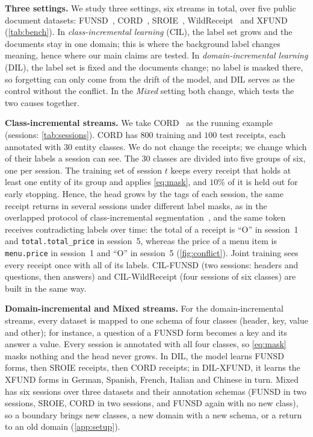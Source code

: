 \documentclass[10pt,twocolumn,letterpaper]{article}
\newcommand{\runin}[1]{\par\addvspace{0.7ex plus .3ex minus .1ex}\noindent\textbf{#1}\hspace{1em}\ignorespaces}
\begin{document}
\runin{Three settings.} We study three settings, six streams in total, over five public document datasets: FUNSD~\citep{jaume2019funsd}, CORD~\citep{park2019cord}, SROIE~\citep{huang2019sroie}, WildReceipt~\citep{sun2021sdmgr} and XFUND~\citep{xu2022xfund} (\cref{tab:bench}). In \emph{class-incremental learning} (CIL), the label set grows and the documents stay in one domain; this is where the background label changes meaning, hence where our main claims are tested. In \emph{domain-incremental learning} (DIL), the label set is fixed and the documents change; no label is masked there, so forgetting can only come from the drift of the model, and DIL serves as the control without the conflict. In the \emph{Mixed} setting both change, which tests the two causes together.

\runin{Class-incremental streams.} We take CORD~\citep{park2019cord} as the running example (sessions: \cref{tab:sessions}). CORD has $800$ training and $100$ test receipts, each annotated with $30$ entity classes. We do not change the receipts; we change which of their labels a session can see. The $30$ classes are divided into five groups of six, one per session. The training set of session $t$ keeps every receipt that holds at least one entity of its group and applies \cref{eq:mask}, and $10\%$ of it is held out for early stopping. Hence, the head grows by the tags of each session, the same receipt returns in several sessions under different label masks, as in the overlapped protocol of class-incremental segmentation~\citep{cermelli2020mib}, and the same token receives contradicting labels over time: the total of a receipt is ``O'' in session~1 and \texttt{total.total\_price} in session~5, whereas the price of a menu item is \texttt{menu.price} in session~1 and ``O'' in session~5 (\cref{fig:conflict}). Joint training sees every receipt once with all of its labels. CIL-FUNSD (two sessions: headers and questions, then answers) and CIL-WildReceipt (four sessions of six classes) are built in the same way.

\runin{Domain-incremental and Mixed streams.} For the domain-incremental streams, every dataset is mapped to one schema of four classes (header, key, value and other); for instance, a question of a FUNSD form becomes a key and its answer a value. Every session is annotated with all four classes, so \cref{eq:mask} masks nothing and the head never grows. In DIL, the model learns FUNSD forms, then SROIE receipts, then CORD receipts; in DIL-XFUND, it learns the XFUND forms in German, Spanish, French, Italian and Chinese in turn. Mixed has six sessions over three datasets and their annotation schemas (FUNSD in two sessions, SROIE, CORD in two sessions, and FUNSD again with no new class), so a boundary brings new classes, a new domain with a new schema, or a return to an old domain (\cref{app:setup}).
\end{document}
